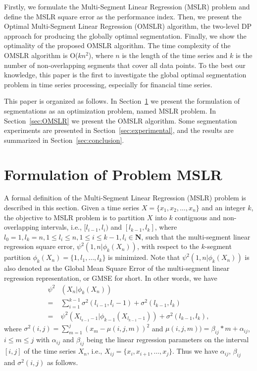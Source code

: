 \documentclass{article}
\begin{document}
Firstly, we formulate the Multi-Segment Linear Regression (MSLR) problem and define the MSLR square error as the performance index. Then, we present the Optimal Multi-Segment Linear Regression (OMSLR) algorithm, the two-level DP approach for producing the globally optimal segmentation. Finally, we show the optimality of the proposed OMSLR algorithm. The time complexity of the OMSLR algorithm is O($kn^2$), where $n$ is the length of the time series and $k$ is the number of non-overlapping segments that cover all data points. To the best our knowledge, this paper is the first to investigate the global optimal segmentation problem in time series processing, especially for financial time series.



This paper is organized as follows. In Section~\ref{sec:formulation} we present the formulation of segmentations as an optimization problem, named MSLR problem. In Section~\ref{sec:OMSLR} we present the OMSLR algorithm. Some segmentation experiments are presented in Section~\ref{sec:experimental}, and the results are summarized in Section~\ref{sec:conclusion}.

\section{Formulation of Problem MSLR}
\label{sec:formulation}
A formal definition of the Multi-Segment Linear Regression (MSLR) problem is described in this section. Given a time series $X = \{x_1, x_2,\dots,x_n\}$ and an integer $k$, the objective to MSLR problem is to partition $X$ into $k$ contiguous and non-overlapping intervals, i.e., $[l_{i-1},l_{i})$ and $[l_{k-1},l_{k}]$, where $l_0=1, l_k=n, 1\leq l_i \leq n, 1 \leq i \leq k-1, l_i \in \mathbf{N}$, such that the multi-segment linear regression square error, $\psi^2(1, n | \phi_k(X_n))$, with respect to the $k$-segment partition $\phi_k(X_n)=\{1, l_1, \dots, l_k\}$ is minimized. Note that $\psi^2(1, n | \phi_k(X_n))$ is also denoted as the Global Mean Square Error of the multi-segment linear regression representation, or GMSE for short. In other words, we have
\begin{equation}\label{eqn:1}
  \begin{aligned}
  \psi^2&(X_n | \phi_k(X_n)) \\
  =&\sum_{i=1}^{k-1} \sigma^2 (l_{i-1},l_i-1) + \sigma^2 (l_{k-1},l_k) \\
  =&\psi^2(X_{l_{k-1}-1}| \phi_{k-1}(X_{l_{k-1}-1})) + \sigma^2 (l_{k-1},l_k),
\end{aligned}
\end{equation}
where $\sigma^2(i,j)=\sum_{m=1}^{j}(x_m - \mu(i,j,m))^2$ and $\mu(i,j,m)) = \beta_{ij}*m + \alpha_{ij}$, $i \leq m \leq j$ with $\alpha_{ij}$ and $\beta_{ij}$ being the linear regression parameters on the interval $[i,j]$ of the time series $X_n$, i.e., $X_{ij}=\{x_i, x_{i+1}, \dots, x_j \}$. Thus we have $\alpha_{ij}$, $\beta_{ij}$ and $\sigma^2(i,j)$ as follows.
\end{document}
